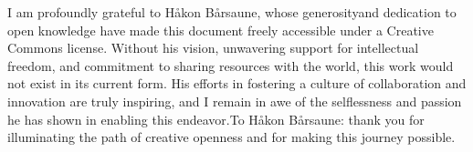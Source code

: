 I am profoundly grateful to Håkon Bårsaune, whose generosityand dedication to
open knowledge have made this document freely accessible under a Creative
Commons license. Without his vision, unwavering support for intellectual
freedom, and commitment to sharing resources with the world, this work would
not exist in its current form. His efforts in fostering a culture of
collaboration and innovation are truly inspiring, and I remain in awe of the
selflessness and passion he has shown in enabling this endeavor.To
Håkon Bårsaune: thank you for illuminating the path of creative openness
and for making this journey possible.
